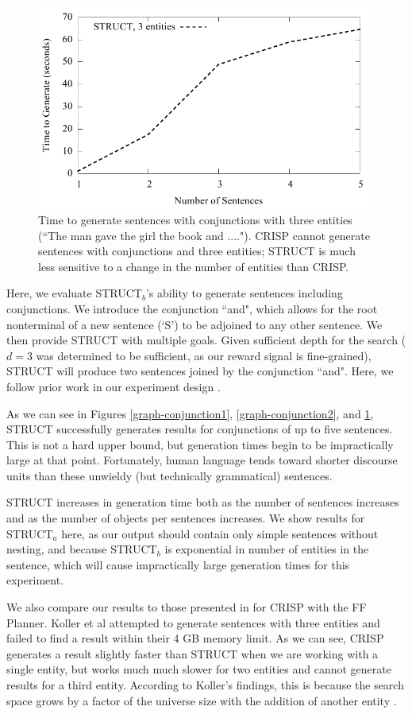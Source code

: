 \begin{figure}
\centering
\includegraphics[width=0.7 \linewidth]{../analysis/struct/conjunction/conjunction3.pdf}
\caption{Time to generate sentences with conjunctions with three entities (``The man gave the girl the book and ....").
CRISP cannot generate sentences with conjunctions and three entities; STRUCT is much less sensitive to a change
in the number of entities than CRISP.}
\label{graph-conjunction3}
\end{figure}

Here, we evaluate STRUCT$_b$'s ability to generate sentences including
conjunctions.  We introduce the conjunction ``and", which allows for the
root nonterminal of a new sentence (`S') to be adjoined to any other sentence.
We then provide STRUCT with multiple goals.  Given sufficient depth for the
search ($d=3$ was determined to be sufficient, as our reward signal is fine-grained),
STRUCT will produce two sentences joined by the conjunction ``and".
Here, we follow prior work in our experiment design \cite{koller_experiences_2011}.

As we can see in Figures \ref{graph-conjunction1}, \ref{graph-conjunction2}, and
\ref{graph-conjunction3}, STRUCT successfully generates results
for conjunctions of up to five sentences.  This is not a hard upper bound, but
generation times begin to be impractically large at that point.
Fortunately, human language tends toward
shorter discourse units than these unwieldy (but technically grammatical) sentences.

STRUCT increases in generation time both as the number of sentences increases and as
the number of objects per sentences increases.  We show results for STRUCT$_a$ here,
as our output should contain only simple sentences without nesting, and because
STRUCT$_b$ is exponential in number of entities in the sentence, which will cause
impractically large generation times for this experiment.

We also compare our results to those presented in \cite{koller_experiences_2011} for
CRISP with the FF Planner.  Koller et al attempted to generate sentences with
three entities and failed to find a result within their 4 GB memory limit.  As we
can see, CRISP generates a result slightly faster than STRUCT when we are 
working with a single entity, but works much much slower for two entities
and cannot generate results for a third entity.  According to Koller's findings,
this is because the search space grows by a factor of the universe size with
the addition of another entity \cite{koller_experiences_2011}.

